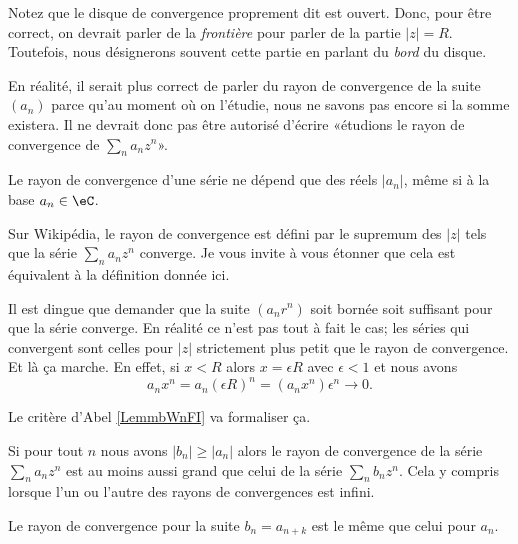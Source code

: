 \begin{normaltext}
	Notez que le disque de convergence proprement dit est ouvert. Donc, pour être correct, on devrait parler de la \emph{frontière} pour parler de la partie \( | z |=R\). Toutefois, nous désignerons souvent cette partie en parlant du \emph{bord} du disque.
\end{normaltext}

\begin{normaltext}
	En réalité, il serait plus correct de parler du rayon de convergence de la suite \( (a_n)\) parce qu'au moment où on l'étudie, nous ne savons pas encore si la somme existera. Il ne devrait donc pas être autorisé d'écrire «étudions le rayon de convergence de \( \sum_na_nz^n\)».

	Le rayon de convergence d'une série ne dépend que des réels \( | a_n |\), même si à la base \( a_n\in \eC\).
\end{normaltext}

\begin{normaltext}
	Sur Wikipédia\cite{BIBooRVNCooAKQeld}, le rayon de convergence est défini par le supremum des \( | z |\) tels que la série \( \sum_na_nz^n\) converge. Je vous invite à vous étonner que cela est équivalent à la définition donnée ici.

	Il est dingue que demander que la suite \( (a_nr^n)\) soit bornée soit suffisant pour que la série converge. En réalité ce n'est pas tout à fait le cas; les séries qui convergent sont celles pour \( | z |\) strictement plus petit que le rayon de convergence. Et là ça marche. En effet, si \( x<R\) alors \( x=\epsilon R\) avec \( \epsilon<1\) et nous avons
	\begin{equation}
		a_nx^n=a_n(\epsilon R)^n=(a_nx^n)\epsilon^n\to 0.
	\end{equation}

	Le critère d'Abel \ref{LemmbWnFI} va formaliser ça.
\end{normaltext}

\begin{remark}      \label{REMooYOTEooKvxHSf}
	Si pour tout \( n\) nous avons \( | b_n |\geq | a_n |\) alors le rayon de convergence de la série \( \sum_na_nz^n\) est au moins aussi grand que celui de la série \( \sum_nb_nz^n\). Cela y compris lorsque l'un ou l'autre des rayons de convergences est infini.
\end{remark}

\begin{lemma}    \label{LEMooVCTNooCQHkzs}
	Le rayon de convergence pour la suite \( b_n=a_{n+k}\) est le même que celui pour \( a_n\).
\end{lemma}

